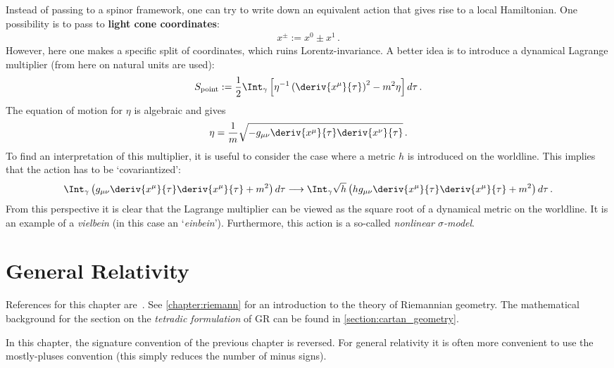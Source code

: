     Instead of passing to a spinor framework, one can try to write down an equivalent action that gives rise to a local Hamiltonian. One possibility is to pass to \textbf{light cone coordinates}:
    \begin{gather}
        x^\pm := x^0\pm x^1\,.
    \end{gather}
    However, here one makes a specific split of coordinates, which ruins Lorentz-invariance. A better idea is to introduce a dynamical Lagrange multiplier (from here on natural units are used):
    \begin{gather}
        S_{\text{point}} := \frac{1}{2}\Int_\gamma\left[\eta^{-1}\left(\deriv{x^\mu}{\tau}\right)^2-m^2\eta\right]d\tau\,.
    \end{gather}
    The equation of motion for $\eta$ is algebraic and gives
    \begin{gather}
        \eta = \frac{1}{m}\sqrt{-g_{\mu\nu}\deriv{x^\mu}{\tau}\deriv{x^\nu}{\tau}}\,.
    \end{gather}
    To find an interpretation of this multiplier, it is useful to consider the case where a metric $h$ is introduced on the worldline. This implies that the action has to be `covariantized':
    \begin{gather}
        \Int_\gamma\left(g_{\mu\nu}\deriv{x^\mu}{\tau}\deriv{x^\mu}{\tau}+m^2\right)d\tau\longrightarrow\Int_\gamma\sqrt{h}\left(hg_{\mu\nu}\deriv{x^\mu}{\tau}\deriv{x^\mu}{\tau}+m^2\right)d\tau\,.
    \end{gather}
    From this perspective it is clear that the Lagrange multiplier can be viewed as the square root of a dynamical metric on the worldline. It is an example of a \textit{vielbein} (in this case an `\textit{einbein}'). Furthermore, this action is a so-called \textit{nonlinear $\sigma$-model}.


\chapter{General Relativity}\label{chapter:GR}

    References for this chapter are~\citet{rovelli_covariant_2014,misner_gravitation_2017}. See \cref{chapter:riemann} for an introduction to the theory of Riemannian geometry. The mathematical background for the section on the \textit{tetradic formulation} of GR can be found in \cref{section:cartan_geometry}.

    In this chapter, the signature convention of the previous chapter is reversed. For general relativity it is often more convenient to use the mostly-pluses convention (this simply reduces the number of minus signs).

